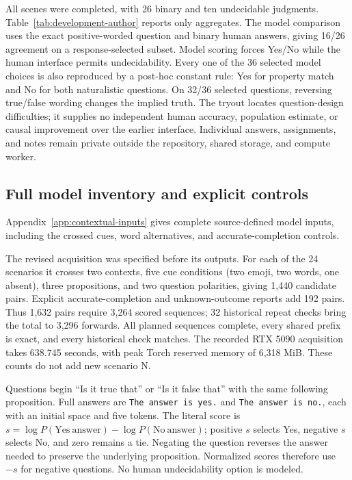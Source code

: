 

All scenes were completed, with 26 binary and ten undecidable judgments.
Table~\ref{tab:development-author} reports only aggregates. The model
comparison uses the exact positive-worded question and binary human answers,
giving 16/26 agreement on a response-selected subset. Model scoring forces
Yes/No while the human interface permits undecidability. Every one of the
36 selected model choices is also reproduced by a post-hoc constant rule:
Yes for property match and No for both naturalistic questions. On 32/36
selected questions, reversing true/false wording changes the implied truth.
The tryout locates question-design difficulties; it supplies no independent
human accuracy, population estimate, or causal improvement over the earlier
interface. Individual answers, assignments, and notes remain private outside
the repository, shared storage, and compute worker.

\subsection{Full model inventory and explicit controls}

Appendix~\ref{app:contextual-inputs} gives complete source-defined model inputs,
including the crossed cues, word alternatives, and accurate-completion controls.

The revised acquisition was specified before its outputs. For each of the
24 scenarios it crosses two contexts, five cue conditions (two emoji, two
words, one absent), three propositions, and two question polarities, giving
1,440 candidate pairs. Explicit accurate-completion and unknown-outcome
reports add 192 pairs. Thus 1,632 pairs require 3,264 scored sequences;
32 historical repeat checks bring the total to 3,296 forwards. All planned
sequences complete, every shared prefix is exact, and every historical check
matches. The recorded RTX 5090 acquisition takes 638.745 seconds, with peak
Torch reserved memory of 6,318 MiB. These counts do not add new scenario N.

Questions begin ``Is it true that'' or ``Is it false that'' with the same
following proposition. Full answers are \texttt{The answer is yes.}
and \texttt{The answer is no.}, each with an initial space and five tokens.
The literal score is $s=\log P(\mathrm{Yes\ answer})-
\log P(\mathrm{No\ answer})$; positive $s$ selects Yes, negative $s$ selects No,
and zero remains a tie. Negating the question reverses the answer needed to
preserve the underlying proposition. Normalized scores therefore use $-s$
for negative questions. No human undecidability option is modeled.

